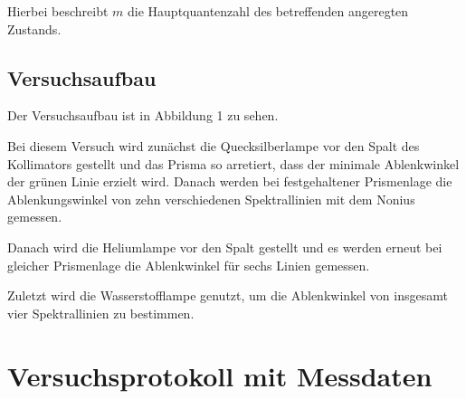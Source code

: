 \documentclass{article}
\begin{document}
Hierbei beschreibt $m$ die Hauptquantenzahl des betreffenden angeregten Zustands. 

\subsection{Versuchsaufbau}

Der Versuchsaufbau ist in Abbildung 1 zu sehen.

Bei diesem Versuch wird zunächst die Quecksilberlampe vor den Spalt des Kollimators gestellt und das Prisma so arretiert, dass der minimale Ablenkwinkel der grünen Linie erzielt wird. Danach werden bei festgehaltener Prismenlage die Ablenkungswinkel von zehn verschiedenen Spektrallinien mit dem Nonius gemessen.

Danach wird die Heliumlampe vor den Spalt gestellt und es werden erneut bei gleicher Prismenlage die Ablenkwinkel für sechs Linien gemessen.

Zuletzt wird die Wasserstofflampe genutzt, um die Ablenkwinkel von insgesamt vier Spektrallinien zu bestimmen.

\newpage

\section{Versuchsprotokoll mit Messdaten}
\end{document}
